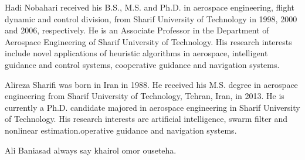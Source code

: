\documentclass[peerreview]{IEEEtran}
\begin{document}
\vspace{-33pt}
\begin{IEEEbiography}{Hadi Nobahari}
  received his B.S., M.S. and Ph.D.
  in aerospace engineering, flight dynamic and control
  division, from Sharif University of Technology in
  1998, 2000 and 2006, respectively. He is an Associate
  Professor in the Department of Aerospace
  Engineering of Sharif University of Technology.
  His research interests include novel applications of
  heuristic algorithms in aerospace, intelligent guidance
  and control systems, cooperative guidance and
  navigation systems.
\end{IEEEbiography}

\vspace{-33pt}
\begin{IEEEbiography}{Alireza Sharifi}
  was born in Iran in 1988. He
received his M.S. degree in aerospace engineering
from Sharif University of Technology, Tehran, Iran,
in 2013. He is currently a Ph.D. candidate majored
in aerospace engineering in Sharif University
of Technology. His research interests are artificial
intelligence, swarm filter and nonlinear estimation.operative guidance and
  navigation systems.
\end{IEEEbiography}

\vspace{-33pt}
\begin{IEEEbiography}{Ali Baniasad}
  always say khairol omor ouseteha.
\end{IEEEbiography}
\end{document}
